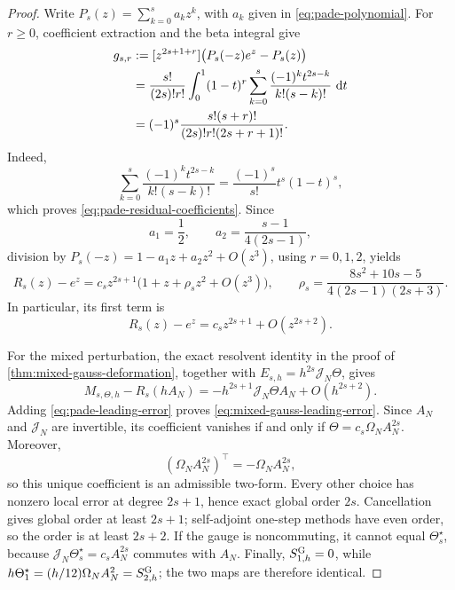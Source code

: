 \documentclass[11pt,a4paper]{article}
\newcommand{\dd}{\,\mathrm d}
\begin{document}
\begin{proof}
Write \(P_s(z)=\sum_{k=0}^sa_kz^k\), with \(a_k\) given in
\cref{eq:pade-polynomial}.  For \(r\ge0\), coefficient extraction and
the beta integral give
\begin{align}
 g_{s,r}
 &:=[z^{2s+1+r}]\bigl(P_s(-z)e^z-P_s(z)\bigr)\notag\\
 &=\frac{s!}{(2s)!r!}
   \int_0^1(1-t)^r
   \sum_{k=0}^s\frac{(-1)^kt^{2s-k}}{k!(s-k)!}\,\dd t\notag\\
 &=(-1)^s\frac{s!(s+r)!}
 {(2s)!r!(2s+r+1)!}.
 \label{eq:pade-residual-coefficients}
\end{align}
Indeed,
\[
 \sum_{k=0}^s\frac{(-1)^kt^{2s-k}}{k!(s-k)!}
 =\frac{(-1)^s}{s!}t^s(1-t)^s,
\]
which proves \cref{eq:pade-residual-coefficients}.  Since
\[
 a_1=\frac12,\qquad
 a_2=\frac{s-1}{4(2s-1)},
\]
division by
\(P_s(-z)=1-a_1z+a_2z^2+O(z^3)\), using \(r=0,1,2\), yields
\begin{equation}\label{eq:pade-three-term-error}
 R_s(z)-e^z
 =c_sz^{2s+1}\bigl(1+z+\rho_sz^2+O(z^3)\bigr),
 \qquad
 \rho_s=\frac{8s^2+10s-5}{4(2s-1)(2s+3)}.
\end{equation}
In particular, its first term is
\begin{equation}\label{eq:pade-leading-error}
 R_s(z)-e^z=c_sz^{2s+1}+O(z^{2s+2}).
\end{equation}

For the mixed perturbation, the exact resolvent identity in the proof of
\cref{thm:mixed-gauss-deformation}, together with
\(E_{s,h}=h^{2s}\mathcal J_N\Theta\), gives
\[
 M_{s,\Theta,h}-R_s(hA_N)
 =-h^{2s+1}\mathcal J_N\Theta A_N+O(h^{2s+2}).
\]
Adding \cref{eq:pade-leading-error} proves
\cref{eq:mixed-gauss-leading-error}.  Since \(A_N\) and
\(\mathcal J_N\) are invertible, its coefficient vanishes if and only if
\(\Theta=c_s\Omega_NA_N^{2s}\).  Moreover,
\[
 (\Omega_NA_N^{2s})^\top=-\Omega_NA_N^{2s},
\]
so this unique coefficient is an admissible two-form.  Every other choice
has nonzero local error at degree \(2s+1\), hence exact global order
\(2s\).  Cancellation gives global order at least \(2s+1\); self-adjoint
one-step methods have even order, so the order is at least \(2s+2\).
If the gauge is noncommuting, it cannot equal
\(\Theta_s^\star\), because
\(\mathcal J_N\Theta_s^\star=c_sA_N^{2s}\) commutes with \(A_N\).
Finally, \(S^{\rm G}_{1,h}=0\), while
\(h\Theta_1^\star=(h/12)\Omega_NA_N^2=S^{\rm G}_{2,h}\); the two maps
are therefore identical.


\end{proof}
\end{document}
